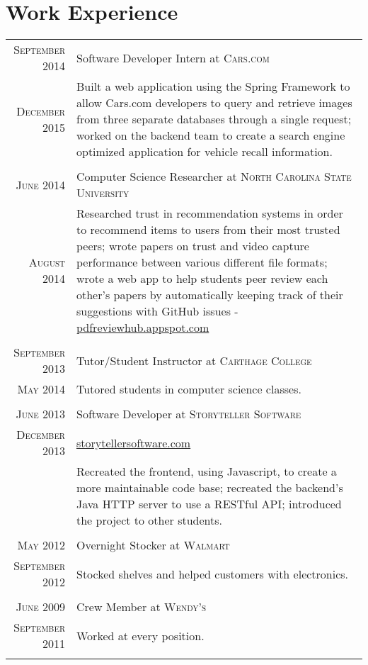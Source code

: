\documentclass[letterpaper,10pt]{article}
\begin{document}
    \section{Work Experience}
    \begin{tabular}{r|p{13.9cm}}

     \textsc{September 2014} & Software Developer Intern at \textsc{Cars.com}
     \\\textsc{December 2015}
     &\small{Built a web application using the Spring Framework to allow Cars.com developers to query and retrieve images from three separate databases through a single request; worked on the backend team to create a search engine optimized application for vehicle recall information.} \\\multicolumn{2}{c}{}\\

     \textsc{June 2014} & Computer Science Researcher at \textsc{North Carolina State University}
     \\\textsc{August 2014}
     &\small{Researched trust in recommendation systems in order to recommend items to users from their most trusted peers; wrote papers on trust and video capture performance between various different file formats; wrote a web app to help students peer review each other's papers by automatically keeping track of their suggestions with GitHub issues -  \href{http://pdfreviewhub.appspot.com}{pdfreviewhub.appspot.com}} \\\multicolumn{2}{c}{}\\

     \textsc{September 2013} & Tutor/Student Instructor at \textsc{Carthage College} \\\textsc{May 2014}
     &\small{Tutored students in computer science classes.}\\\multicolumn{2}{c}{} \\

     \textsc{June 2013} & Software Developer at \textsc{Storyteller Software} \\\textsc{December 2013}
     &\small{\href{http://www.storytellersoftware.com/}{storytellersoftware.com}} \\
     &\small{Recreated the frontend, using Javascript, to create a more maintainable code base; recreated the backend's Java HTTP server to use a RESTful API; introduced the project to other students.} \\\multicolumn{2}{c}{} \\

     \textsc{May 2012} & Overnight Stocker at \textsc{Walmart} \\\textsc{September 2012}
     &\small{Stocked shelves and helped customers with electronics.}\\\multicolumn{2}{c}{} \\

     \textsc{June 2009} & Crew Member at \textsc{Wendy's} \\\textsc{September 2011}
     &\small{Worked at every position.}\\\multicolumn{2}{c}{} \\

    \end{tabular}
\end{document}
